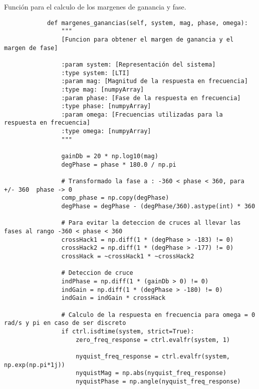     \begin{longlisting}
        \caption[Calculo de los margenes de ganancia y fase]{Función para el calculo de los margenes de ganancia y fase.}
        \label{code:anexoA}				
        \begin{verbatim}
            def margenes_ganancias(self, system, mag, phase, omega):
                """
                [Funcion para obtener el margen de ganancia y el margen de fase]
                
                :param system: [Representación del sistema]
                :type system: [LTI]
                :param mag: [Magnitud de la respuesta en frecuencia]
                :type mag: [numpyArray]
                :param phase: [Fase de la respuesta en frecuencia]
                :type phase: [numpyArray]
                :param omega: [Frecuencias utilizadas para la respuesta en frecuencia]
                :type omega: [numpyArray]
                """

                gainDb = 20 * np.log10(mag)
                degPhase = phase * 180.0 / np.pi

                # Transformado la fase a : -360 < phase < 360, para +/- 360  phase -> 0
                comp_phase = np.copy(degPhase)
                degPhase = degPhase - (degPhase/360).astype(int) * 360

                # Para evitar la deteccion de cruces al llevar las fases al rango -360 < phase < 360
                crossHack1 = np.diff(1 * (degPhase > -183) != 0)
                crossHack2 = np.diff(1 * (degPhase > -177) != 0)
                crossHack = ~crossHack1 * ~crossHack2

                # Deteccion de cruce
                indPhase = np.diff(1 * (gainDb > 0) != 0)
                indGain = np.diff(1 * (degPhase > -180) != 0)
                indGain = indGain * crossHack

                # Calculo de la respuesta en frecuencia para omega = 0 rad/s y pi en caso de ser discreto
                if ctrl.isdtime(system, strict=True):
                    zero_freq_response = ctrl.evalfr(system, 1)
                    
                    nyquist_freq_response = ctrl.evalfr(system, np.exp(np.pi*1j))
                    nyquistMag = np.abs(nyquist_freq_response)
                    nyquistPhase = np.angle(nyquist_freq_response)
                    

\end{verbatim}
\end{longlisting}
